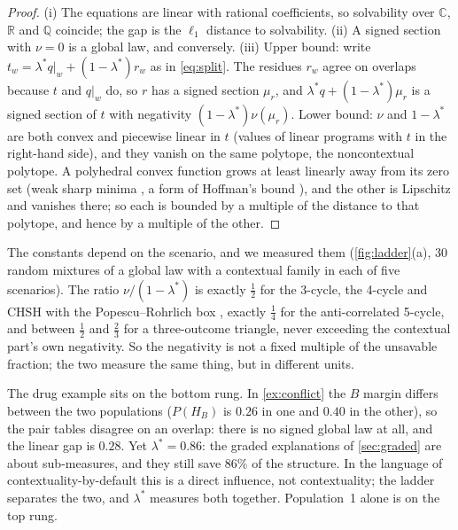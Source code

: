 \documentclass[11pt]{article}
\theoremstyle{definition}\newtheorem{definition}[theorem]{Definition}\newtheorem{remark}[theorem]{Remark}\newtheorem{example}[theorem]{Example}
\newcommand{\R}{\mathbb R}
\begin{document}
\begin{proof}
(i) The equations are linear with rational coefficients, so solvability over $\mathbb C$, $\R$ and $\mathbb Q$ coincide; the gap is the
$\ell_1$ distance to solvability. (ii) A signed section with $\nu=0$ is a global law, and conversely. (iii) Upper bound: write $t_w=\lambda^*q|_w+
(1-\lambda^*)r_w$ as in \eqref{eq:split}. The residues $r_w$ agree on overlaps because $t$ and $q|_w$ do, so $r$ has a signed section
$\mu_r$, and $\lambda^*q+(1-\lambda^*)\mu_r$ is a signed section of $t$ with negativity $(1-\lambda^*)\nu(\mu_r)$. Lower bound: $\nu$ and
$1-\lambda^*$ are both convex and piecewise linear in $t$ (values of linear programs with $t$ in the right-hand side), and they vanish on
the same polytope, the noncontextual polytope. A polyhedral convex function grows at least linearly away from its zero set (weak sharp
minima \cite{BurkeFerris1993}, a form of Hoffman's bound \cite{Hoffman1952}), and the other is Lipschitz and vanishes there; so each is
bounded by a multiple of the distance to that polytope, and hence by a multiple of the other.
\end{proof}

The constants depend on the scenario, and we measured them (\cref{fig:ladder}(a), 30 random mixtures of a global law with a contextual
family in each of five scenarios). The ratio $\nu/(1-\lambda^*)$ is exactly $\tfrac12$ for the 3-cycle, the 4-cycle and CHSH \cite{CHSH1969} with the
Popescu--Rohrlich box \cite{PopescuRohrlich1994}, exactly $\tfrac14$ for the anti-correlated 5-cycle, and between $\tfrac12$ and $\tfrac23$ for a three-outcome
triangle, never exceeding the contextual part's own negativity. So the negativity is not a fixed multiple of the unsavable fraction; the
two measure the same thing, but in different units.

The drug example sits on the bottom rung. In \cref{ex:conflict} the $B$ margin differs between the two populations ($P(H_B)$ is $0.26$ in
one and $0.40$ in the other), so the pair tables disagree on an overlap: there is no signed global law at all, and the linear gap is
$0.28$. Yet $\lambda^*=0.86$: the graded explanations of \cref{sec:graded} are about sub-measures, and they still save $86\%$ of the
structure. In the language of contextuality-by-default \cite{DzhafarovKujala2016} this is a direct influence, not contextuality; the
ladder separates the two, and $\lambda^*$ measures both together. Population~1 alone is on the top rung.
\end{document}
